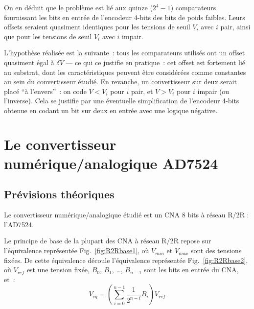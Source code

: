 \documentclass{article}
\begin{document}
On en déduit que le problème est lié aux quinze ($2^4-1$) comparateurs fournissant les bits en entrée de l'encodeur 4-bits des bits de poids faibles. Leurs offsets seraient quasiment identiques pour les tensions de seuil $V_i$ avec $i$ pair, ainsi que pour les tensions de seuil $V_i$ avec $i$ impair.

L'hypothèse réalisée est la suivante~: tous les comparateurs utilisés ont un offset quasiment égal à $\delta V$ --- ce qui ce justifie en pratique~: cet offset est fortement lié au substrat, dont les caractéristiques peuvent être considérées comme constantes au sein du convertisseur étudié. En revanche, un convertisseur sur deux serait placé ``à l'envers''~: on code ${V < V_i}$ pour $i$ pair, et ${V > V_i}$ pour $i$ impair (ou l'inverse). Cela se justifie par une éventuelle simplification de l'encodeur 4-bits obtenue en codant un bit sur deux en entrée avec une logique négative.


\section{Le convertisseur numérique/analogique AD7524}
\label{sec:AD7524}

\subsection{Prévisions théoriques}


Le convertisseur numérique/analogique étudié est un CNA 8 bits à réseau R/2R : l'AD7524.

Le principe de base de la plupart des CNA à réseau R/2R repose sur l'équivalence représentée Fig.~\ref{fig:R2Rbase1}, où $V_{min}$ et $V_{max}$ sont des tensions fixées. De cette équivalence découle l'équivalence représentée Fig.~\ref{fig:R2Rbase2}, où $V_{ref}$ est une tension fixée, $B_0$, $B_1$, \dots, $B_{n-1}$ sont les bits en entrée du CNA, et~:
\begin{equation*}
V_{eq} = \left(\sum_{i=0}^{n-1}\frac{1}{2^{n-i}}B_i\right)V_{ref}
\end{equation*}
\end{document}
